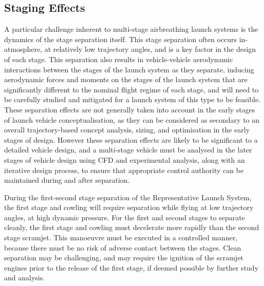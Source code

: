 \subsection{Staging Effects}\label{sec:stagingSimp}
A particular challenge inherent to multi-stage airbreathing launch systems is the dynamics of the stage separation itself. This stage separation often occurs in-atmosphere, at relatively low trajectory angles, and is a key factor in the design of each stage. This separation also results in vehicle-vehicle aerodynamic interactions between the stages of the launch system as they separate, inducing aerodynamic forces and moments on the stages of the launch system that are significantly different to the nominal flight regime of each stage, and will need to be carefully studied and mitigated for a launch system of this type to be feasible\cite{mochammad,Kudo2005}. 
These separation effects are not generally taken into account in the early stages of launch vehicle conceptualisation, as they can be considered as secondary to an overall trajectory-based concept analysis, sizing, and optimisation in the early stages of design.  
However these separation effects are likely to be significant to a detailed vehicle design, and a multi-stage vehicle must be analysed in the later stages of vehicle design using CFD and experimental analysis, along with an iterative design process, to ensure that appropriate control authority can be maintained during and after separation\cite{mochammad}.  

During the first-second stage separation of the Representative Launch System, the first stage and cowling will require separation while flying at low trajectory angles, at high dynamic pressure. For the first and second stages to separate cleanly, the first stage and cowling must decelerate more rapidly than the second stage scramjet. This manoeuvre must be executed in a controlled manner, because there must be no risk of adverse contact between the stages. Clean separation may be challenging, and may require the ignition of the scramjet engines prior to the release of the first stage, if deemed possible by further study and analysis. 

